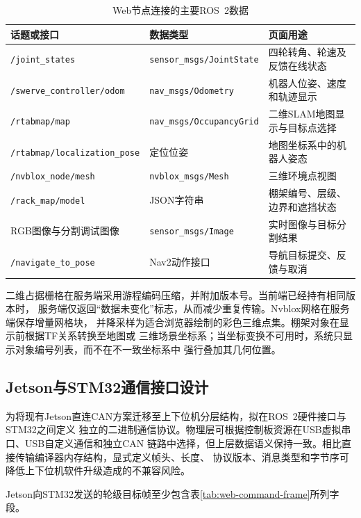 \documentclass[UTF8,12pt,a4paper,openany]{ctexbook}
\begin{document}
\begin{table}[htbp]
    \centering
    \caption{Web节点连接的主要ROS~2数据}
    \label{tab:web-ros-topics}
    \begin{tabularx}{\textwidth}{p{5.1cm}p{4.0cm}X}
        \toprule
        话题或接口 & 数据类型 & 页面用途 \\
        \midrule
        \texttt{/joint\_states} & \texttt{sensor\_msgs/JointState} & 四轮转角、轮速及反馈在线状态 \\
        \texttt{/swerve\_controller/odom} & \texttt{nav\_msgs/Odometry} & 机器人位姿、速度和轨迹显示 \\
        \texttt{/rtabmap/map} & \texttt{nav\_msgs/OccupancyGrid} & 二维SLAM地图显示与目标点选择 \\
        \texttt{/rtabmap/localization\_pose} & 定位位姿 & 地图坐标系中的机器人姿态 \\
        \texttt{/nvblox\_node/mesh} & \texttt{nvblox\_msgs/Mesh} & 三维环境点视图 \\
        \texttt{/rack\_map/model} & JSON字符串 & 棚架编号、层级、边界和遮挡状态 \\
        RGB图像与分割调试图像 & \texttt{sensor\_msgs/Image} & 实时图像与目标分割结果 \\
        \texttt{/navigate\_to\_pose} & Nav2动作接口 & 导航目标提交、反馈与取消 \\
        \bottomrule
    \end{tabularx}
\end{table}

二维占据栅格在服务端采用游程编码压缩，并附加版本号。当前端已经持有相同版本时，
服务端仅返回“数据未变化”标志，从而减少重复传输。Nvblox网格在服务端保存增量网格块，
并降采样为适合浏览器绘制的彩色三维点集。棚架对象在显示前根据TF关系转换至地图或
三维场景坐标系；当坐标变换不可用时，系统只显示对象编号列表，而不在不一致坐标系中
强行叠加其几何位置。

\subsection{Jetson与STM32通信接口设计}

为将现有Jetson直连CAN方案迁移至上下位机分层结构，拟在ROS~2硬件接口与STM32之间定义
独立的二进制通信协议。物理层可根据控制板资源在USB虚拟串口、USB自定义通信和独立CAN
链路中选择，但上层数据语义保持一致。相比直接传输编译器内存结构，显式定义帧头、长度、
协议版本、消息类型和字节序可降低上下位机软件升级造成的不兼容风险。

Jetson向STM32发送的轮级目标帧至少包含表\ref{tab:web-command-frame}所列字段。
\end{document}
